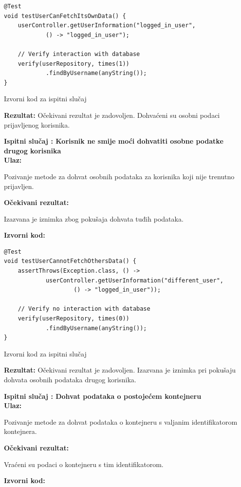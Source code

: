 			\begin{listing}[H]
\begin{verbatim}
@Test
void testUserCanFetchItsOwnData() {
    userController.getUserInformation("logged_in_user",
            () -> "logged_in_user");

    // Verify interaction with database
    verify(userRepository, times(1))
            .findByUsername(anyString());
}
\end{verbatim}
				\caption{Izvorni kod za ispitni slučaj \thetestcase}
				\label{test2}
			\end{listing}
			\noindent \textbf{Rezultat:} Očekivani rezultat je zadovoljen. Dohvaćeni su osobni podaci prijavljenog korisnika.
			\clearpage

			\noindent \textbf{Ispitni slučaj \thetestcase: Korisnik ne smije moći dohvatiti osobne podatke drugog korisnika} \\
			\noindent \textbf{Ulaz:}
			\begin{packed_enum}
				\item Pozivanje metode za dohvat osobnih podataka za korisnika koji nije trenutno prijavljen.
			\end{packed_enum}
			\noindent \textbf{Očekivani rezultat:}
			\begin{packed_enum}
				\item[1.a] Izazvana je iznimka zbog pokušaja dohvata tuđih podataka.
			\end{packed_enum}
			\noindent \textbf{Izvorni kod:}

			\begin{listing}[H]
\begin{verbatim}
@Test
void testUserCannotFetchOthersData() {
    assertThrows(Exception.class, () ->
            userController.getUserInformation("different_user", 
                    () -> "logged_in_user"));

    // Verify no interaction with database
    verify(userRepository, times(0))
            .findByUsername(anyString());
}
\end{verbatim}
				\caption{Izvorni kod za ispitni slučaj \thetestcase}
				\label{test2}
			\end{listing}
			\noindent \textbf{Rezultat:} Očekivani rezultat je zadovoljen. Izazvana je iznimka pri pokušaju dohvata osobnih podataka drugog korisnika.
			\clearpage

			\noindent \textbf{Ispitni slučaj \thetestcase: Dohvat podataka o postojećem kontejneru} \\
			\noindent \textbf{Ulaz:}
			\begin{packed_enum}
				\item Pozivanje metode za dohvat podataka o kontejneru s valjanim identifikatorom kontejnera.
			\end{packed_enum}
			\noindent \textbf{Očekivani rezultat:}
			\begin{packed_enum}
				\item[1.a] Vraćeni su podaci o kontejneru s tim identifikatorom.
			\end{packed_enum}
			\noindent \textbf{Izvorni kod:}


